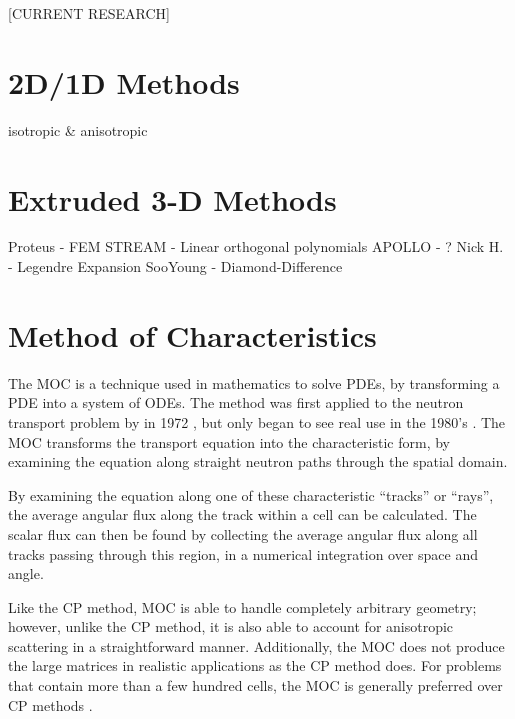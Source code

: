{{    [CURRENT RESEARCH]
  }

  
  
  

  \section{2D/1D Methods}{\label{sec:3T:2D/1D Methods}
    isotropic \& anisotropic
  }

  \section{Extruded 3-D Methods}{\label{sec:3T:Extruded 3-D Methods}
    Proteus - FEM
    STREAM - Linear orthogonal polynomials
    APOLLO - ?
    Nick H. - Legendre Expansion
    SooYoung - Diamond-Difference
  }

  \section{Method of Characteristics}{\label{sec:3T:Method of Characteristics}
    The \acf{MOC} is a technique used in mathematics to solve \acp{PDE}, by transforming a \ac{PDE} into a system of \acp{ODE}.
    The method was first applied to the neutron transport problem by \citeauthor{Askew1972} in 1972 \cite{Askew1972}, but only began to see real use in the 1980's \cite{Halsall1980}.
    The \ac{MOC} transforms the transport equation into the characteristic form, by examining the equation along straight neutron paths through the spatial domain.

    By examining the equation along one of these characteristic ``tracks'' or ``rays'', the average angular flux along the track within a cell can be calculated.
    The scalar flux can then be found by collecting the average angular flux along all tracks passing through this region, in a numerical integration over space and angle.

    Like the \ac{CP} method, \ac{MOC} is able to handle completely arbitrary geometry; however, unlike the \ac{CP} method, it is also able to account for anisotropic scattering in a straightforward manner.
    Additionally, the \ac{MOC} does not produce the large matrices in realistic applications as the \ac{CP} method does.
    For problems that contain more than a few hundred cells, the \ac{MOC} is generally preferred over \ac{CP} methods \cite{Hebert2010}.

}}
